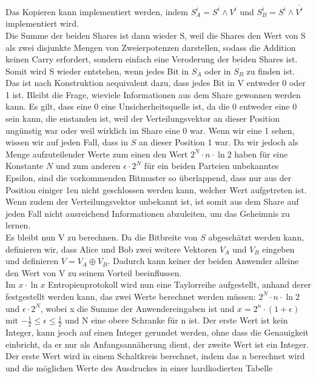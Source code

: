 \documentclass{article}
\begin{document}
Das Kopieren kann implementiert werden, indem \(S_A^i = S^i \wedge V^i\) und
\(S_B^i = S^i \wedge \overline{V^i}\) implementiert wird.\\
Die Summe der beiden Shares ist dann wieder S, weil die Shares den Wert von
S als zwei disjunkte Mengen von Zweierpotenzen darstellen, sodass die Addition
keinen Carry erfordert, sondern einfach eine Veroderung der beiden Shares ist.
Somit wird S wieder entstehen, wenn jedes Bit in \(S_A\) oder in \(S_B\) zu
finden ist. Das ist nach Konstruktion aequivalent dazu, dass jedes Bit in V
entweder 0 oder 1 ist. Bleibt die Frage, wieviele Informationen aus dem Share
gewonnen werden kann. Es gilt, dass eine 0 eine Unsicherheitsquelle ist, da
die 0 entweder eine 0 sein kann, die enstanden ist, weil der Verteilungsvektor
an dieser Position ung\"unstig war oder weil wirklich im Share eine 0 war.
Wenn wir eine 1 sehen, wissen wir auf jeden Fall, dass in \(S\) an dieser
Position 1 war. Da wir jedoch als Menge aufzuteilender Werte zum einen den
Wert \(2^N \cdot n \cdot \ln 2\) haben f\"ur eine Konstante \(N\) und zum
anderen \(\epsilon \cdot 2^N\) f\"ur ein beiden Parteien unbekanntes
Epsilon, sind die vorkommenden Bitmuster so \"uberlappend, dass nur aus der
Position einiger 1en nicht geschlossen werden kann, welcher Wert aufgetreten 
ist. Wenn zudem der Verteilungsvektor unbekannt ist, ist somit aus dem Share
auf jeden Fall nicht ausreichend Informationen abzuleiten, um das Geheimnis
zu lernen.\\
Es bleibt nun V zu berechnen. Da die Bitbreite von \(S\) abgesch\"atzt werden
kann, definieren wir, dass Alice und Bob zwei weitere Vektoren \(V_A\) und
\(V_B\) eingeben und definieren \(V = V_A \oplus V_B\). Dadurch kann keiner
der beiden Anwender alleine den Wert von V zu seinem Vorteil beeinflussen.\\
Im \(x \cdot \ln x\) Entropienprotokoll wird nun eine Taylorreihe aufgestellt,
anhand derer festgestellt werden kann, das zwei Werte berechnet werden m\"ussen:
\(2^N \cdot n \cdot \ln 2\) und \(\epsilon \cdot 2^N\), wobei x die
Summe der Anwendereingaben ist und \(x = 2^n\cdot(1+\epsilon)\) mit 
\(-\frac{1}{2} \leq \epsilon \leq \frac{1}{2}\) und N eine obere Schranke
f\"ur n ist. Der erste Wert ist kein Integer, kann jeoch auf einen Integer
gerundet werden, ohne dass die Genauigkeit einbricht, da er nur als
Anfangsann\"aherung dient, der zweite Wert ist ein Integer.\\
Der erste Wert wird in einem Schaltkreis berechnet, indem das n berechnet wird
und die m\"oglichen Werte des Ausdruckes in einer hardkodierten Tabelle
\end{document}
